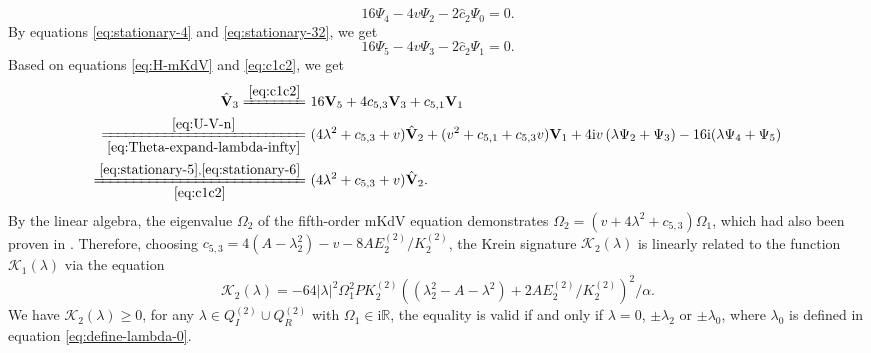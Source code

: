 \documentclass[11pt,reqno]{amsart}
\newcommand{\ii}{\mathrm{i}}
\numberwithin{equation}{section}
\begin{document}
\begin{proof-kerin}
\begin{equation}\label{eq:stationary-5}
	16\Psi_4-4v\Psi_2-2 \hat{c}_2 \Psi_0=0.
\end{equation}
By equations \eqref{eq:stationary-4} and \eqref{eq:stationary-32},
we get 
\begin{equation}\label{eq:stationary-6}
	16\Psi_5-4v\Psi_3-2 \hat{c}_2 \Psi_1=0.
\end{equation}
Based on equations \eqref{eq:H-mKdV} and \eqref{eq:c1c2}, we get
\begin{equation}\nonumber
	\begin{split}
		\hat{\mathbf{V}}_3
		\xlongequal{\eqref{eq:c1c2}} &\ 16\mathbf{V}_5+4c_{5,3}\mathbf{V}_3+c_{5,1}\mathbf{V}_1 \\
		\xlongequal[\eqref{eq:Theta-expand-lambda-infty}]{\eqref{eq:U-V-n}} &\ 
		 (4 \lambda^2+c_{5,3}+v) \hat{\mathbf{V}}_2 +(v^2+c_{5,1}+c_{5,3} v)\mathbf{V}_1+4\ii v\left( \lambda \Psi_2+\Psi_3\right)-16\ii (\lambda\Psi_4+\Psi_5)\\
		\xlongequal[\eqref{eq:c1c2}]{\eqref{eq:stationary-5},\eqref{eq:stationary-6}}
		&\  (4 \lambda^2+c_{5,3}+v) \hat{\mathbf{V}}_2.
	\end{split}
\end{equation} 
By the linear algebra, the eigenvalue $\Omega_2$ of the fifth-order mKdV equation demonstrates $\Omega_2
=(v+4\lambda^2+c_{5,3})\Omega_1$, which had also been proven in \cite{Deconinck-10}.
Therefore, choosing $c_{5,3}=4(A-\lambda_2^2)-v-8A E^{(2)}_2/  K^{(2)}_2$,  the Krein signature $\mathcal{K}_2(\lambda)$ is linearly related to the function $\mathcal{K}_1(\lambda)$ via the equation 
\begin{equation}\label{eq:K_2(z)}
	\mathcal{K}_2(\lambda)
	=-64|\lambda|^2 \Omega_1^2P  K^{(2)}_2 \left((\lambda_2^2-A-\lambda^2)+2A E^{(2)}_2/  K^{(2)}_2\right)^2/\alpha .
\end{equation}
We have $\mathcal{K}_2(\lambda)\ge 0$, for any $\lambda\in  Q^{(2)} _I\cup  Q^{(2)} _R$ with $\Omega_1\in \ii \mathbb{R}$, the equality is valid if and only if $\lambda=0$, $ \pm \lambda_2$ or $\pm \lambda_0$, where $\lambda_0$ is defined in equation \eqref{eq:define-lambda-0}.
\end{proof-kerin}
\end{document}
